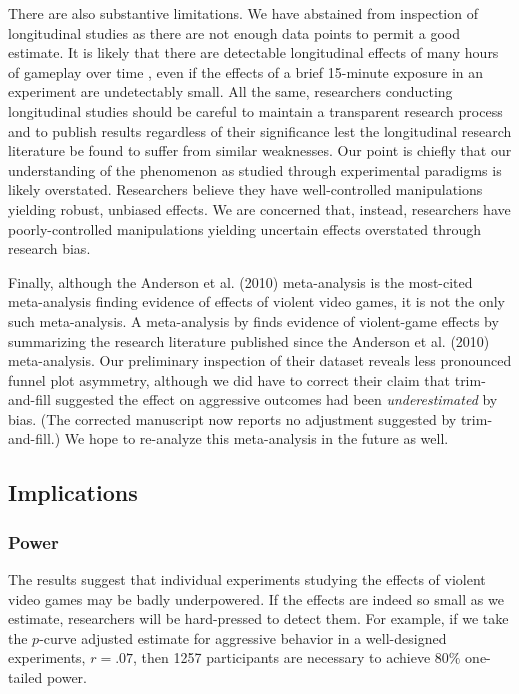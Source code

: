 \documentclass[man, mask]{apa6}
\begin{document}
There are also substantive limitations. We have abstained from inspection of longitudinal studies as there are not enough data points to permit a good estimate. It is likely that there are detectable longitudinal effects of many hours of gameplay over time \citep[e.g.,][]{Willoughby:etal:2012}, even if the effects of a brief 15-minute exposure in an experiment are undetectably small. All the same, researchers conducting longitudinal studies should be careful to maintain a transparent research process and to publish results regardless of their significance lest the longitudinal research literature be found to suffer from similar weaknesses. 
Our point is chiefly that our understanding of the phenomenon as studied through experimental paradigms is likely overstated. Researchers believe they have well-controlled manipulations yielding robust, unbiased effects. We are concerned that, instead, researchers have poorly-controlled manipulations yielding uncertain effects overstated through research bias.

Finally, although the Anderson et al. (2010) meta-analysis is the most-cited meta-analysis finding evidence of effects of violent video games, it is not the only such meta-analysis. A meta-analysis by \citet{Greitemeyer:Mugge:2014} finds evidence of violent-game effects by summarizing the research literature published since the Anderson et al. (2010) meta-analysis. Our preliminary inspection of their dataset reveals less pronounced funnel plot asymmetry, although we did have to correct their claim that trim-and-fill suggested the effect on aggressive outcomes had been {\em underestimated} by bias. (The corrected manuscript now reports no adjustment suggested by trim-and-fill.) We hope to re-analyze this meta-analysis in the future as well.

\subsection{Implications}

\subsubsection{Power}
The results suggest that individual experiments studying the effects of violent video games may be badly underpowered. If the effects are indeed so small as we estimate, researchers will be hard-pressed to detect them. For example, if we take the $p$-curve adjusted estimate for aggressive behavior in a well-designed experiments, $r = .07$, then 1257 participants are necessary to achieve $80\%$ one-tailed power. 
\end{document}
